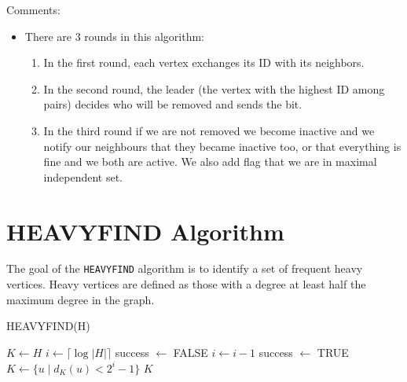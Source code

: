 \documentclass{article}
\begin{document}
Comments:
\begin{itemize}
    \item There are 3 rounds in this algorithm:
    \begin{enumerate}
        \item In the first round, each vertex exchanges its ID with its neighbors.
        \item In the second round, the leader (the vertex with the highest ID among pairs) decides who will be removed and sends the bit.
        \item In the third round if we are not removed we become inactive and we notify our neighbours that they became inactive too, or that everything is fine and we both are active. We also add flag that we are in maximal independent set.
    \end{enumerate}
\end{itemize}

\section*{HEAVYFIND Algorithm}

The goal of the \texttt{HEAVYFIND} algorithm is to identify a set of frequent heavy vertices. Heavy vertices are defined as those with a degree at least half the maximum degree in the graph.

\begin{algorithm}[H]
    \caption{HEAVYFIND(H)}
    \begin{algorithmic}[1]
        \STATE $K \leftarrow H$
        \STATE $i \leftarrow \lceil \log |H| \rceil$
        \STATE success $\leftarrow$ FALSE
            \STATE $i \leftarrow i - 1$
                \STATE success $\leftarrow$ TRUE
            \ELSE
                \STATE $K \leftarrow \{u \mid d_K(u) < 2^i - 1\}$
            \ENDIF
        \ENDWHILE
        \RETURN $K$
    \end{algorithmic}
\end{algorithm}
\end{document}
